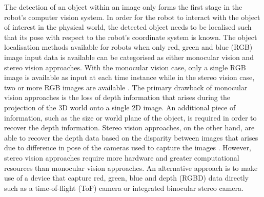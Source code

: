 

The detection of an object within an image only forms the first stage in the robot's computer vision system. In order for the robot to interact with the object of interest in the physical world, the detected object needs to be localised such that its pose with respect to the robot's coordinate system is known. The object localisation methods available for robots when only red, green and blue (RGB) image input data is available can be categorised as either monocular vision and stereo vision approaches. With the monocular vision case, only a single RGB image is available as input at each time instance while in the stereo vision case, two or more RGB images are available \cite{Liu:6DOF_Object_Localization}. The primary drawback of monocular vision approaches is the loss of depth information that arises during the projection of the 3D world onto a single 2D image. An additional piece of information, such as the size or world plane of the object, is required in order to recover the depth information. Stereo vision approaches, on the other hand, are able to recover the depth data based on the disparity between images that arises due to difference in pose of the cameras used to capture the images \cite{Azad:Stereo-based_6D_Object_Localization}. However, stereo vision approaches require more hardware and greater computational resources than monocular vision approaches. An alternative approach is to make use of a device that capture red, green, blue and depth (RGBD) data directly such as a time-of-flight (ToF) camera or integrated binocular stereo camera. 

